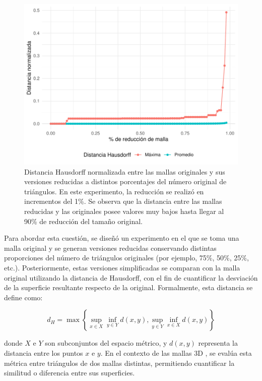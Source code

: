 \begin{figure}[h]
    \centering
    \includegraphics[width=\linewidth]{figures/5_experiments/mesh_redux_study.pdf}
    \caption[Estudio de reducción de mallas]{Distancia Hausdorff normalizada entre las mallas originales y sus versiones reducidas a distintos porcentajes del número original de triángulos. En este experimento, la reducción se realizó en incrementos del 1\%. Se observa que la distancia entre las mallas reducidas y las originales posee valores muy bajos hasta llegar al 90\% de reducción del tamaño original.}
    \label{fig5:redux_study}
\end{figure}

Para abordar esta cuestión, se diseñó un experimento en el que se toma una malla original y se generan versiones reducidas conservando distintas proporciones del número de triángulos originales (por ejemplo, 75\%, 50\%, 25\%, etc.). Posteriormente, estas versiones simplificadas se comparan con la malla original utilizando la distancia de Hausdorff, con el fin de cuantificar la desviación de la superficie resultante respecto de la original. Formalmente, esta distancia se define como:

\begin{equation}
d_H = \max\left\{\sup_{x\in X} \inf_{y \in Y} d(x,y), \sup_{y\in Y} \inf_{x \in X} d(x,y) \right\}
\end{equation}

donde $X$ e $Y$ son subconjuntos del espacio métrico, y $d(x,y)$ representa la distancia entre los puntos $x$ e $y$. En el contexto de las mallas 3D \cite{cignoni1998metro}, se evalúa esta métrica entre triángulos de dos mallas distintas, permitiendo cuantificar la similitud o diferencia entre sus superficies.

